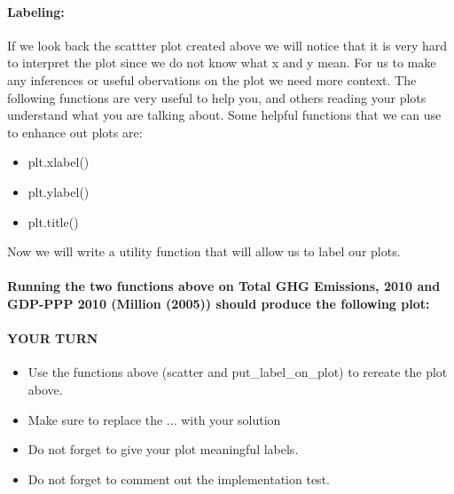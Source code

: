 \documentclass[11pt]{article}
\providecommand{\tightlist}{%
      \setlength{\itemsep}{0pt}\setlength{\parskip}{0pt}}
\begin{document}
    \paragraph{Labeling:}\label{labeling}

If we look back the scattter plot created above we will notice that it
is very hard to interpret the plot since we do not know what x and y
mean. For us to make any inferences or useful obervations on the plot we
need more context. The following functions are very useful to help you,
and others reading your plots understand what you are talking about.
Some helpful functions that we can use to enhance out plots are:

\begin{itemize}
\tightlist
\item
  plt.xlabel()
\item
  plt.ylabel()
\item
  plt.title()
\end{itemize}

    Now we will write a utility function that will allow us to label our
plots.

    \paragraph{\texorpdfstring{Running the two functions above on
\textbf{Total GHG Emissions, 2010} and \textbf{GDP-PPP 2010 (Million
(2005))} should produce the following
plot:}{Running the two functions above on Total GHG Emissions, 2010 and GDP-PPP 2010 (Million (2005)) should produce the following plot:}}\label{running-the-two-functions-above-on-total-ghg-emissions-2010-and-gdp-ppp-2010-million-2005-should-produce-the-following-plot}

    

    \paragraph{YOUR TURN }\label{your-turn}

\begin{itemize}
\tightlist
\item
  Use the functions above (scatter and put\_label\_on\_plot) to rereate
  the plot above.
\item
  Make sure to replace the ... with your solution
\item
  Do not forget to give your plot meaningful labels.
\item
  Do not forget to comment out the implementation test.
\end{itemize}
\end{document}
